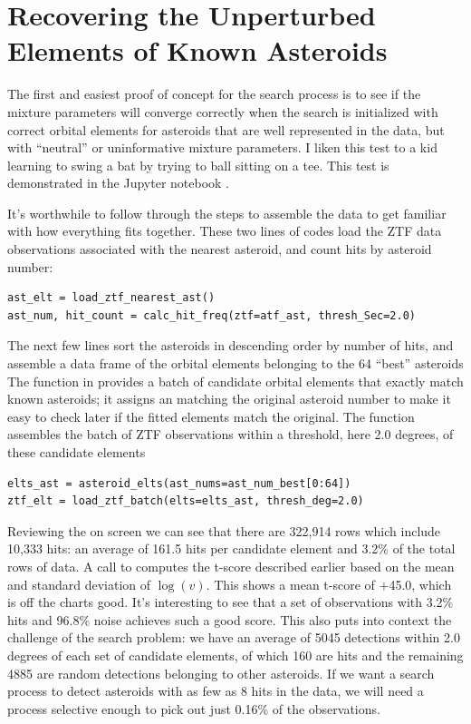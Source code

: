 \section{Recovering the Unperturbed Elements of Known Asteroids}
\label{section_results_known_ast_unperturbed}

The first and easiest proof of concept for the search process is to see if the mixture parameters will converge correctly
when the search is initialized with correct orbital elements for asteroids that are well represented in the data,
but with ``neutral'' or uninformative mixture parameters.
I liken this test to a kid learning to swing a bat by trying to ball sitting on a tee.
This test is demonstrated in the Jupyter notebook .

It's worthwhile to follow through the steps to assemble the data to get familiar with how everything fits together.
These two lines of codes load the ZTF data observations associated with the nearest asteroid, and count hits by asteroid number:
\begin{lstlisting}[style=CodeSnippet]
ast_elt = load_ztf_nearest_ast()
ast_num, hit_count = calc_hit_freq(ztf=atf_ast, thresh_Sec=2.0)
\end{lstlisting}
The next few lines sort the asteroids in descending order by number of hits, 
and assemble a data frame of the orbital elements belonging to the 64 ``best'' asteroids
The function  in  provides a batch of candidate orbital elements
that exactly match known asteroids; it assigns an  matching the original asteroid number to make it easy
to check later if the fitted elements match the original.
The function  assembles the batch of ZTF observations within a threshold, 
here 2.0 degrees, of these candidate elements
\begin{lstlisting}[style=CodeSnippet]
elts_ast = asteroid_elts(ast_nums=ast_num_best[0:64])
ztf_elt = load_ztf_batch(elts=elts_ast, thresh_deg=2.0)
\end{lstlisting}

Reviewing the  on screen we can see that there are 322,914 rows which include 10,333 hits:
an average of 161.5 hits per candidate element and 3.2\% of the total rows of data.
A call to  computes the t-score described earlier based on the mean and standard deviation of $\log(v)$.
This shows a mean t-score of +45.0, which is off the charts good.
It's interesting to see that a set of observations with 3.2\% hits and 96.8\% noise achieves such a good score.
This also puts into context the challenge of the search problem: 
we have an average of 5045 detections within 2.0 degrees of each set of candidate elements,
of which 160 are hits and the remaining 4885 are random detections belonging to other asteroids.
If we want a search process to detect asteroids with as few as 8 hits in the data, 
we will need a process selective enough to pick out just 0.16\% of the observations.

